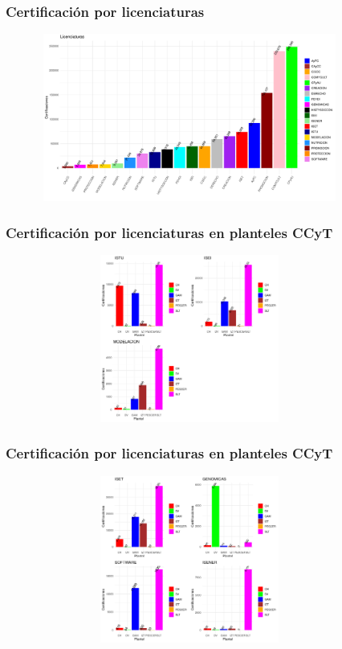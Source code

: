 \documentclass[xcolor=dvipsnames]{beamer}
\begin{document}
\begin{frame}\frametitle{Certificaci\'on por licenciaturas}
\begin{figure}[H]
\centering
\includegraphics[width=10cm,height=5.5cm]{Imagenes/graficoCertificacionesLicGral.pdf}
\end{figure}
\end{frame}

\begin{frame}\frametitle{Certificaci\'on por licenciaturas en planteles CCyT}
\begin{figure}[H]
\centering
\includegraphics[width=10cm,height=5.5cm]{Imagenes/GraficasCertificacionLicenciaturas1.pdf}
\end{figure}
\end{frame}

\begin{frame}\frametitle{Certificaci\'on por licenciaturas en planteles CCyT}
\begin{figure}[H]
\centering
\includegraphics[width=10cm,height=5.5cm]{Imagenes/GraficasCertificacionLicenciaturas2.pdf}
\end{figure}
\end{frame}
\end{document}
